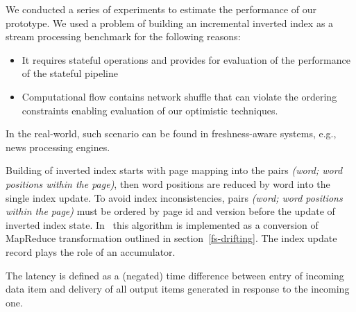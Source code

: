 
\label{fs-experiments-section}

We conducted a  series of experiments to estimate the performance of our  prototype. 
We used a problem of building an incremental inverted index as a stream processing benchmark  for the following reasons:

\begin{itemize}
    \item It requires stateful operations and provides for evaluation of the performance of the  stateful pipeline
    \item Computational flow contains network shuffle that can violate the ordering constraints %
    enabling evaluation of our optimistic techniques.
\end{itemize}

In the real-world, such scenario can be found in freshness-aware systems, e.g., news processing engines.

Building of inverted index %
starts with page mapping into the pairs {\it (word; word positions within the page)}, then  word positions are reduced by word into the single index update. 
%
To avoid index inconsistencies, pairs {\it (word; word positions within the page)} must be ordered by page id and version before the update of inverted index state. 
In \FlameStream\ this algorithm is implemented as a conversion of MapReduce transformation 
outlined in  section~\ref{fs-drifting}.
The index update record plays the role of an accumulator. 

The latency is defined as a (negated) time difference between entry of incoming data item and delivery of all output items generated in response to the incoming one.



